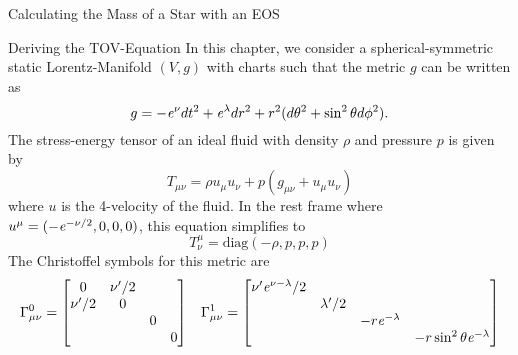 \begin{section}{Calculating the Mass of a Star with an EOS}
\begin{subsection}{Deriving the TOV-Equation}
\label{3-Mass-TOVDerivation}
In this chapter, we consider a spherical-symmetric static Lorentz-Manifold $(V,g)$ with charts such that the metric $g$ can be written as
\begin{equation}
	g=-\mathit{e}^\nu dt^2+\mathit{e}^\lambda dr^2 + r^2(d\theta^2+\sin^2\theta d\phi^2).
\end{equation}
The stress-energy tensor of an ideal fluid with density $\rho$ and pressure $p$ is given by
\begin{equation}
	T_{\mu\nu}=\rho u_\mu u_\nu + p(g_{\mu\nu}+u_\mu u_\nu)
\end{equation}
where $u$ is the 4-velocity of the fluid. In the rest frame where $u^\mu=(-\mathit{e}^{-\nu/2},0,0,0)$, this equation simplifies to
\begin{equation}
	T^\mu_\nu=\text{diag}(-\rho,p,p,p)
\end{equation}
The Christoffel symbols for this metric are
\begin{align}
	\Gamma_{\mu\nu}^0 &= \begin{bmatrix}
	                     	0 & \nu'/2 & & \\
	                     	\nu'/2 & 0 & & \\
	                     	& & 0 &\\
	                     	& & & 0
	                     \end{bmatrix}\hspace{0.3cm}
	\Gamma_{\mu\nu}^1 = \begin{bmatrix}
	                     	\nu'\e^{\nu-\lambda}/2 & & &\\
	                     	& \lambda'/2 & & \\
	                     	& & -r\e^{-\lambda} & \\
	                     	& & & -r\sin^2\theta\e^{-\lambda}
	                     \end{bmatrix}\\

\end{align}
\end{subsection}
\end{section}

